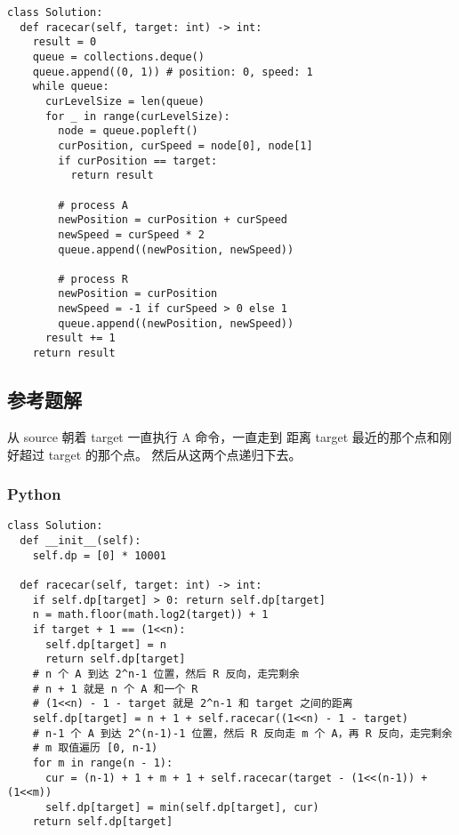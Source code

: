 \begin{verbatim}
class Solution:
  def racecar(self, target: int) -> int:
    result = 0
    queue = collections.deque()
    queue.append((0, 1)) # position: 0, speed: 1
    while queue:
      curLevelSize = len(queue)
      for _ in range(curLevelSize):
        node = queue.popleft()
        curPosition, curSpeed = node[0], node[1]
        if curPosition == target:
          return result

        # process A
        newPosition = curPosition + curSpeed
        newSpeed = curSpeed * 2
        queue.append((newPosition, newSpeed))

        # process R
        newPosition = curPosition
        newSpeed = -1 if curSpeed > 0 else 1
        queue.append((newPosition, newSpeed))
      result += 1
    return result
\end{verbatim}

\subsection{参考题解}

从 source 朝着 target 一直执行 A 命令，一直走到
距离 target 最近的那个点和刚好超过 target 的那个点。
然后从这两个点递归下去。

\subsubsection{Python}

\begin{verbatim}
class Solution:
  def __init__(self):
    self.dp = [0] * 10001

  def racecar(self, target: int) -> int:
    if self.dp[target] > 0: return self.dp[target]
    n = math.floor(math.log2(target)) + 1
    if target + 1 == (1<<n):
      self.dp[target] = n
      return self.dp[target]
    # n 个 A 到达 2^n-1 位置，然后 R 反向，走完剩余
    # n + 1 就是 n 个 A 和一个 R
    # (1<<n) - 1 - target 就是 2^n-1 和 target 之间的距离
    self.dp[target] = n + 1 + self.racecar((1<<n) - 1 - target)
    # n-1 个 A 到达 2^(n-1)-1 位置，然后 R 反向走 m 个 A，再 R 反向，走完剩余
    # m 取值遍历 [0, n-1)
    for m in range(n - 1):
      cur = (n-1) + 1 + m + 1 + self.racecar(target - (1<<(n-1)) + (1<<m))
      self.dp[target] = min(self.dp[target], cur)
    return self.dp[target]
\end{verbatim}
